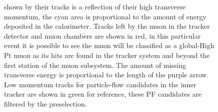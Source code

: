 \begin{figure}
{    shown by their tracks is a reflection of their high transverse momentum, the cyan
    area is proportional to the amount of energy deposited in the calorimeter. Tracks left by the muon
    in the tracker detector and muon chambers are shown in red, in this particular event it
    is possible to see the muon will be classified as a global-High Pt muon as its hits
    are found in the tracker system and beyond the first station of the muon subsystem.
    The amount of missing
    transverse energy is proportional to the length of the purple arrow. Low momentum
    tracks for particle-flow candidates in the inner tracker are shown in green for
    reference, these PF candidates are filtered by the preselection. }
  \label{fig:Fireworks_eemuv}
\end{figure}

\begin{figure}
  \centering
  \vfil

\end{figure}
